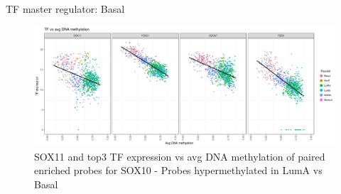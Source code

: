 \documentclass[slidestop,compress,11pt,xcolor=dvipsnames]{beamer}
\begin{document}
\begin{frame}{TF master regulator: Basal}

 \begin{figure}[ht!]
  \centering
  \includegraphics[width=1.0\textwidth]{ELMER/SOX10_TF.png}
  \caption{\label{fig:chiapet} SOX11 and top3 TF expression vs avg DNA methylation of paired enriched probes for SOX10 - Probes hypermethylated in LumA vs Basal}
 \end{figure}
\end{frame}
\end{document}
